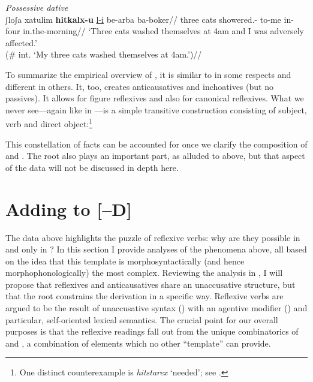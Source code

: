 \ex \textit{Possessive dative}\\
	\begingl 
	\gla \ljudge{\#}ʃloʃa xatulim \textbf{hitkalx-u} \underline{l-i} be-arba ba-boker//
	\glb three cats showered.- to-me in-four in.the-morning//
	\glft `Three cats washed themselves at 4am and I was adversely affected.'\\
		(\# int. `My three cats washed themselves at 4am.')//
	\endgl
\xe

To summarize the empirical overview of {\thit}, it is similar to {\tnif} in some respects and different in others. It, too, creates anticausatives and inchoatives (but no passives). It allows for figure reflexives and also for canonical reflexives. What we never see---again like in {\tnif}---is a simple transitive construction consisting of subject, verb and direct object:\footnote{One distinct counterexample is \emph{hitstarex} `needed'; see \citet[130ff16]{harveskayne12}.}


This constellation of facts can be accounted for once we clarify the composition of {\va} and {\vz}. The root also plays an important part, as alluded to above, but that aspect of the data will not be discussed in depth here.


\section{Adding {\va} to [--D]} \label{vz:va}
The data above highlights the puzzle of reflexive verbs: why are they possible in {\thit} and only in {\thit}? In this section I provide analyses of the phenomena above, all based on the idea that this template is morphosyntactically (and hence morphophonologically) the most complex. Reviewing the analysis in \cite{kastner17gjgl}, I will propose that reflexives and anticausatives share an unaccusative structure, but that the root constrains the derivation in a specific way. Reflexive verbs are argued to be the result of unaccusative syntax (\vz) with an agentive modifier (\va) and particular, self-oriented lexical semantics. The crucial point for our overall purposes is that the reflexive readings fall out from the unique combinatorics of {\vz} and {\va}, a combination of elements which no other ``template'' can provide.

